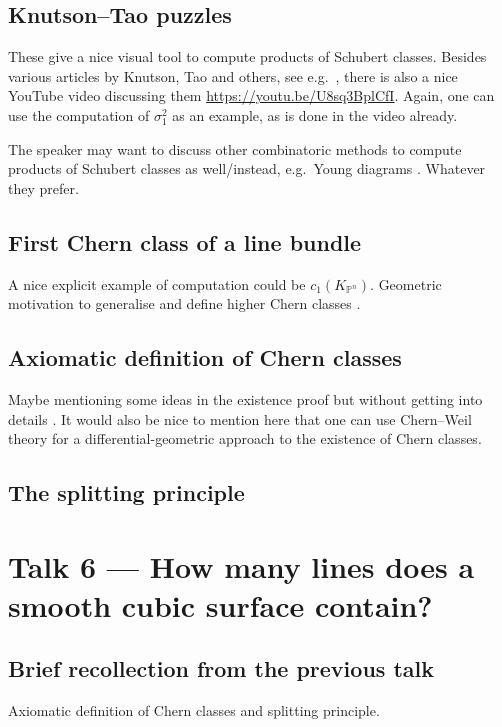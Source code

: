 \documentclass[A4paper, 12pt, british, reqno]{amsart}
\renewcommand{\P}{\mathbb{P}} %
\theoremstyle{plain}
\theoremstyle{definition}
\theoremstyle{remark}
\theoremstyle{plain}
\theoremstyle{definition}
\theoremstyle{remark}
\theoremstyle{plain}
\theoremstyle{definition}
\theoremstyle{remark}
\begin{document}
\subsection{Knutson--Tao puzzles}
These give a nice visual tool to compute products of Schubert classes.
Besides various articles by Knutson, Tao and others, see e.g.~\cite{ktw04}, there is also a nice YouTube video discussing them \href{https://youtu.be/U8sq3BplCfI}{https://youtu.be/U8sq3BplCfI}.
Again, one can use the computation of $\sigma_{1}^{2}$ as an example, as is done in the video already.

The speaker may want to discuss other combinatoric methods to compute products of Schubert classes as well/instead, e.g.~Young diagrams \cite[\S 4.5]{eh16}.
Whatever they prefer.

\subsection{First Chern class of a line bundle \cite[\S 1.4]{eh16}}
A nice explicit example of computation could be $c_{1}(K_{\P^{n}})$.
Geometric motivation to generalise and define higher Chern classes \cite[\S 5.2]{eh16}.

\subsection{Axiomatic definition of Chern classes}
Maybe mentioning some ideas in the existence proof but without getting into details \cite[\S 5.3]{eh16}.
It would also be nice to mention here that one can use Chern--Weil theory for a differential-geometric approach to the existence of Chern classes.

\subsection{The splitting principle \cite[\S 5.4]{eh16}}

\section{Talk 6 --- How many lines does a smooth cubic surface contain?}

\subsection{Brief recollection from the previous talk}
Axiomatic definition of Chern classes and splitting principle.
\end{document}
